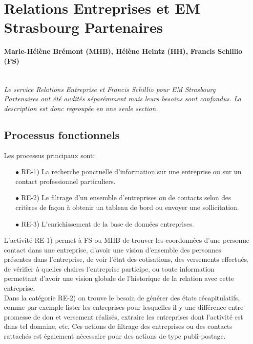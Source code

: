 \documentclass{book}
\begin{document}

\section{Relations Entreprises et EM Strasbourg Partenaires}

\paragraph{Marie-Hélène Brémont (MHB), Hélène Heintz (HH), Francis Schillio (FS)}
~\\

\textit{Le service Relations Entreprise et Francis Schillio pour 
EM Strasbourg Partenaires ont été audités séparémment mais leurs 
besoins sont confondus. La description est donc regroupée en une 
seule section.}


\subsection{Processus fonctionnels}

Les processus principaux sont:
\begin{itemize}
\item[$\bullet$] RE-1) La recherche ponctuelle d'information sur une entreprise 
			     ou sur un contact professionnel particuliers.
\item[$\bullet$] RE-2) Le filtrage d'un ensemble d'entreprises ou de contacts
			     selon des critères de façon à obtenir un tableau de bord
			     ou envoyer une sollicitation. 
\item[$\bullet$] RE-3) L'enrichissement de la base de données entreprises.
\end{itemize}

\bigskip

L'activité RE-1) permet à FS ou MHB de trouver les coordonnées d'une personne
contact dans une entreprise, d'avoir une vision d'ensemble des personnes 
présentes dans l'entreprise, de voir l'état des cotisations, des versements
effectués, de vérifier à quelles chaires l'entreprise participe, ou toute
information permettant d'avoir une vision globale de l'historique de la 
relation avec cette entreprise.\\

Dans la catégorie RE-2) on trouve le besoin de générer des états récapitulatifs,
comme par exemple lister les entreprises pour lesquelles il y une différence
entre promesse de don et versement réalisés, extraire les entreprises dont 
l'activité est dans tel domaine, etc. Ces actions de filtrage des entreprises
ou des contacts rattachés est également nécessaire pour des actions de 
type publi-postage.\\
\end{document}
